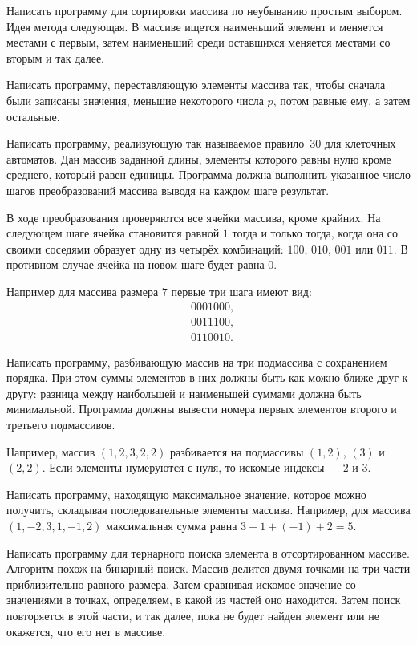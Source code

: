 \task Написать программу для сортировки массива по неубыванию простым
выбором. Идея метода следующая. В массиве ищется наименьший элемент и
меняется местами с первым, затем наименьший среди оставшихся меняется
местами со вторым и так далее.

\task Написать программу, переставляющую элементы массива так, чтобы
сначала были записаны значения, меньшие некоторого числа $p$, потом
равные ему, а затем остальные.

\task Написать программу, реализующую так называемое правило~30 для
клеточных автоматов. Дан массив заданной длины, элементы которого
равны нулю кроме среднего, который равен единицы. Программа должна
выполнить указанное число шагов преобразований массива выводя на
каждом шаге результат.

В ходе преобразования проверяются все ячейки массива, кроме
крайних. На следующем шаге ячейка становится равной $1$ тогда и только
тогда, когда она со своими соседями образует одну из четырёх
комбинаций: $100$, $010$, $001$ или $011$. В противном случае ячейка
на новом шаге будет равна $0$.

Например для массива размера $7$ первые три шага имеют вид:
\begin{eqnarray*}
&0001000,\\
&0011100,\\
&0110010.
\end{eqnarray*}

\task Написать программу, разбивающую массив на три подмассива с
сохранением порядка. При этом суммы элементов в них должны быть как
можно ближе друг к другу: разница между наибольшей и наименьшей
суммами должна быть минимальной. Программа должны вывести номера
первых элементов второго и третьего подмассивов.

Например, массив $(1, 2, 3, 2, 2)$ разбивается на подмассивы $(1, 2)$,
$(3)$ и $(2, 2).$ Если элементы нумеруются с нуля, то искомые индексы
— 2 и 3.

\task Написать программу, находящую максимальное значение, которое
можно получить, складывая последовательные элементы массива. Например,
для массива $(1, -2, 3, 1, -1, 2)$ максимальная сумма равна
$3+1+(-1)+2=5$.

\task Написать программу для тернарного поиска элемента в
отсортированном массиве. Алгоритм похож на бинарный поиск. Массив
делится двумя точками на три части приблизительно равного
размера. Затем сравнивая искомое значение со значениями в точках,
определяем, в какой из частей оно находится. Затем поиск повторяется в
этой части, и так далее, пока не будет найден элемент или не окажется,
что его нет в массиве.


